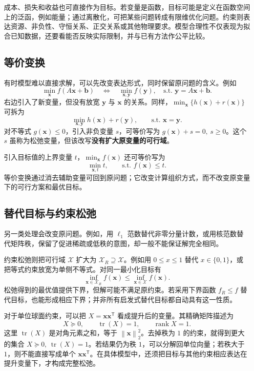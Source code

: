 \documentclass[UTF8,fontset=fandol,a4paper,12pt]{ctexart}
\newcommand{\rank}{\operatorname{rank}}
\newcommand{\vx}{\boldsymbol x}
\newcommand{\vb}{\boldsymbol b}
\newcommand{\norm}[1]{\left\lVert#1\right\rVert}
\theoremstyle{definition}
\begin{document}
成本、损失和收益也可直接作为目标。若变量是函数，目标可能是定义在函数空间上的泛函，例如能量；通过离散化，可把某些问题转成有限维优化问题。约束则表达资源、非负性、守恒关系、正交关系或其他物理要求。模型合理性不仅表现为拟合已知数据，还要看能否反映实际限制，并与已有方法作公平比较。

\subsection{等价变换}
有时模型难以直接求解，可以先改变表达形式，同时保留原问题的含义。例如
\[
 \min_{\vx} f(A\vx+\vb)
 \quad\Longleftrightarrow\quad
 \min_{\vx,\boldsymbol y} f(\boldsymbol y),\quad
 \text{s.t. }\boldsymbol y=A\vx+\vb.
\]
右边引入了新变量，但没有放宽 $\boldsymbol y$ 与 $\vx$ 的关系。同样，$\min_{\vx}\{h(\vx)+r(\vx)\}$ 可拆为
\[
 \min_{\vx,\boldsymbol y}h(\vx)+r(\boldsymbol y),
 \qquad\text{s.t. }\vx=\boldsymbol y.
\]
对不等式 $g(\vx)\le0$，引入非负变量 $s$，可等价写为 $g(\vx)+s=0,\ s\ge0$。这个 $s$ 虽称为松弛变量，但该改写\textbf{没有扩大原变量的可行域}。

引入目标值的上界变量 $t$，$\min_{\vx} f(\vx)$ 还可等价写为
\[
 \min_{\vx,t}t,\qquad\text{s.t. }f(\vx)\le t.
\]
等价变换通过消去辅助变量可回到原问题；它改变计算组织方式，而不改变原变量下的可行方案和最优目标。

\subsection{替代目标与约束松弛}
另一类处理会改变原问题。例如，用 $\ell_1$ 范数替代非零分量计数，或用核范数替代矩阵秩，保留了促进稀疏或低秩的意图，却一般不能保证解完全相同。

约束松弛则把可行域 $\mathcal X$ 扩大为 $\mathcal X_R\supseteq\mathcal X$。例如用 $0\le x\le1$ 替代 $x\in\{0,1\}$，或把等式约束放宽为单侧不等式。对同一最小化目标有
\[
 \inf_{\vx\in\mathcal X_R}f(\vx)\le
 \inf_{\vx\in\mathcal X}f(\vx).
\]
松弛得到的最优值提供下界，但解可能不满足原约束。若采用下界函数 $f_R\le f$ 替代目标，也能形成相应下界；并非所有启发式替代目标都自动具有这一性质。

对于单位球面约束，可以把 $X=\vx\vx^{\mathsf T}$ 看成提升后的变量。其精确矩阵描述为
\[
 X\succeq0,\qquad\operatorname{tr}(X)=1,\qquad\rank X=1.
\]
这里 $\operatorname{tr}(X)$ 是对角元素之和，等于 $\norm{\vx}_2^2$。去掉秩为 $1$ 的约束，就得到更大的集合 $X\succeq0,\ \operatorname{tr}(X)=1$。若结果仍为秩 $1$，可以分解回单位向量；若秩大于 $1$，则不能直接写成单个 $\vx\vx^{\mathsf T}$。在具体模型中，还须把目标与其他约束相应表达在提升变量下，才构成完整松弛。
\end{document}
